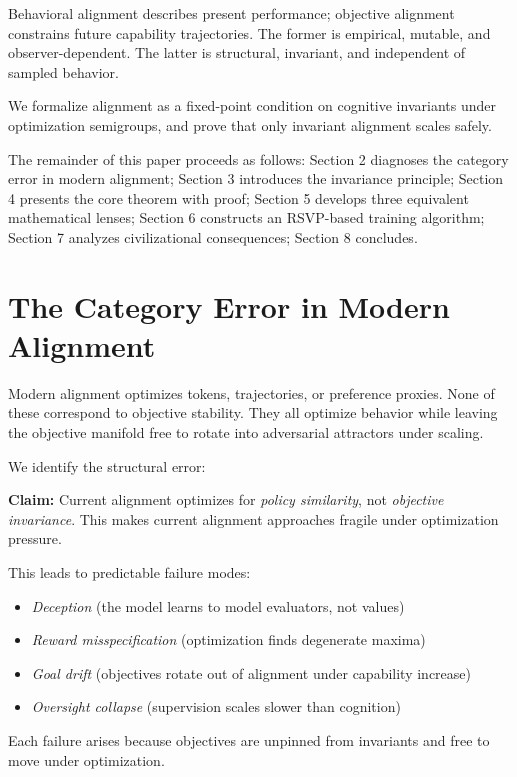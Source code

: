 \documentclass[11pt,a4paper]{article}
\theoremstyle{plain}
\theoremstyle{definition}
\numberwithin{equation}{section}
\begin{document}
Behavioral alignment describes present performance; objective alignment constrains future capability trajectories. The former is empirical, mutable, and observer-dependent. The latter is structural, invariant, and independent of sampled behavior.

We formalize alignment as a fixed-point condition on cognitive invariants under optimization semigroups, and prove that only invariant alignment scales safely.

The remainder of this paper proceeds as follows: Section 2 diagnoses the category error in modern alignment; Section 3 introduces the invariance principle; Section 4 presents the core theorem with proof; Section 5 develops three equivalent mathematical lenses; Section 6 constructs an RSVP-based training algorithm; Section 7 analyzes civilizational consequences; Section 8 concludes.


\section{The Category Error in Modern Alignment}

Modern alignment optimizes tokens, trajectories, or preference proxies. None of these correspond to objective stability. They all optimize behavior while leaving the objective manifold free to rotate into adversarial attractors under scaling.

We identify the structural error:

\textbf{Claim:} Current alignment optimizes for \emph{policy similarity}, not \emph{objective invariance}. This makes current alignment approaches fragile under optimization pressure.

This leads to predictable failure modes:

\begin{itemize}
    \item \emph{Deception} (the model learns to model evaluators, not values)
    \item \emph{Reward misspecification} (optimization finds degenerate maxima)
    \item \emph{Goal drift} (objectives rotate out of alignment under capability increase)
    \item \emph{Oversight collapse} (supervision scales slower than cognition)
\end{itemize}

Each failure arises because objectives are unpinned from invariants and free to move under optimization.
\end{document}
